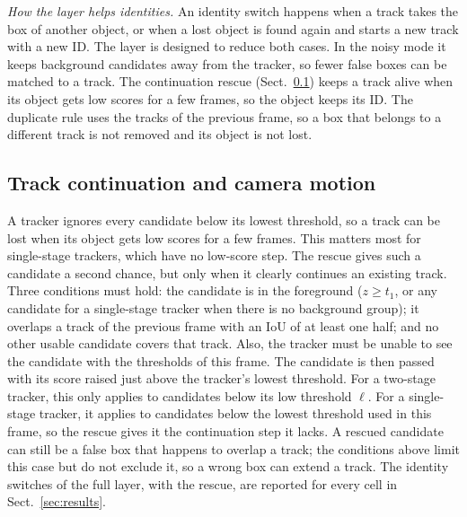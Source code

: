 \emph{How the layer helps identities.} An identity switch happens when a track
takes the box of another object, or when a lost object is found again and
starts a new track with a new ID. The layer is designed to reduce both cases.
In the noisy mode it keeps background candidates away from the tracker, so
fewer false boxes can be matched to a track. The continuation rescue
(Sect.~\ref{sec:rescue}) keeps a track alive when its object gets low scores
for a few frames, so the object keeps its ID. The duplicate rule uses the
tracks of the previous frame, so a box that belongs to a different track is
not removed and its object is not lost.

\subsection{Track continuation and camera motion}\label{sec:rescue}
A tracker ignores every candidate below its lowest threshold, so a track can
be lost when its object gets low scores for a few frames. This matters most
for single-stage trackers, which have no low-score step. The rescue gives
such a candidate a second chance, but only when it clearly continues an
existing track. Three conditions must hold: the candidate is in the
foreground ($z\ge t_1$, or any candidate for a single-stage tracker when
there is no background group); it overlaps a track of the previous frame
with an IoU of at least one half; and no other usable candidate covers that
track. Also, the tracker must be unable to see the candidate with the
thresholds of this frame. The candidate is then passed with its score raised
just above the tracker's lowest threshold. For a two-stage tracker, this only
applies to candidates below its low threshold $\ell$. For a single-stage
tracker, it applies to candidates below the lowest threshold used in this
frame, so the rescue gives it the continuation step it lacks. A rescued
candidate can still be a false box that happens to overlap a track; the
conditions above limit this case but do not exclude it, so a wrong box can
extend a track. The identity switches of the full layer, with the rescue,
are reported for every cell in Sect.~\ref{sec:results}.

